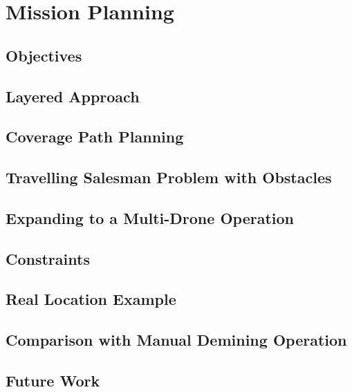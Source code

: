\newpage
{}
\section{Mission Planning} \label{missionplanning}

\subsection{Objectives}

\subsection{Layered Approach}

\subsection{Coverage Path Planning}

\subsection{Travelling Salesman Problem with Obstacles}

\subsection{Expanding to a Multi-Drone Operation}

\subsection{Constraints}

\subsection{Real Location Example}

\subsection{Comparison with Manual Demining Operation}

\subsection{Future Work}